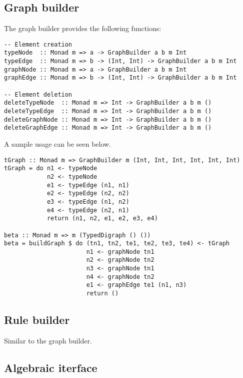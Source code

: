\documentclass[a4paper]{report}
\begin{document}
\subsection{Graph builder}
The graph builder provides the following functions:
\begin{verbatim}
-- Element creation
typeNode  :: Monad m => a -> GraphBuilder a b m Int
typeEdge  :: Monad m => b -> (Int, Int) -> GraphBuilder a b m Int
graphNode :: Monad m => a -> GraphBuilder a b m Int
graphEdge :: Monad m => b -> (Int, Int) -> GraphBuilder a b m Int

-- Element deletion
deleteTypeNode  :: Monad m => Int -> GraphBuilder a b m ()
deleteTypeEdge  :: Monad m => Int -> GraphBuilder a b m ()
deleteGraphNode :: Monad m => Int -> GraphBuilder a b m ()
deleteGraphEdge :: Monad m => Int -> GraphBuilder a b m ()
\end{verbatim}

A sample usage can be seen below.

\begin{verbatim}
tGraph :: Monad m => GraphBuilder m (Int, Int, Int, Int, Int, Int)
tGraph = do n1 <- typeNode
            n2 <- typeNode
            e1 <- typeEdge (n1, n1)
            e2 <- typeEdge (n2, n2)
            e3 <- typeEdge (n1, n2)
            e4 <- typeEdge (n2, n1)
            return (n1, n2, e1, e2, e3, e4)

beta :: Monad m => m (TypedDigraph () ())
beta = buildGraph $ do (tn1, tn2, te1, te2, te3, te4) <- tGraph
                       n1 <- graphNode tn1
                       n2 <- graphNode tn2
                       n3 <- graphNode tn1
                       n4 <- graphNode tn2
                       e1 <- graphEdge te1 (n1, n3)
                       return ()
\end{verbatim}

\subsection{Rule builder}
Similar to the graph builder.

\subsection{Algebraic iterface}
\end{document}
